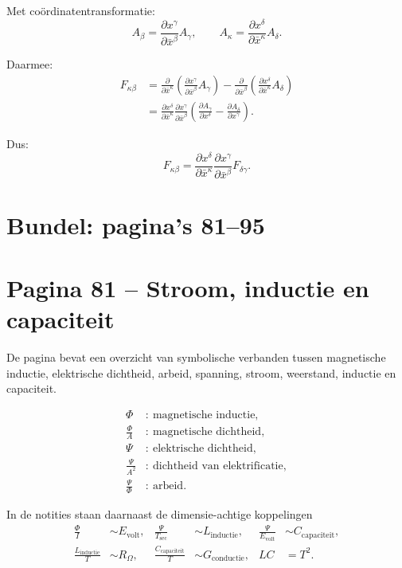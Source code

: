 \documentclass[11pt,a4paper]{article}
\begin{document}
Met coördinatentransformatie:
$$
A_{\beta}
=
\frac{\partial x^{\gamma}}{\partial \bar{x}^{\beta}}
A_{\gamma},
\qquad
A_{\kappa}
=
\frac{\partial x^{\delta}}{\partial \bar{x}^{\kappa}}
A_{\delta}.
$$

Daarmee:
\begin{align*}
F_{\kappa\beta}
&=
\frac{\partial}{\partial\bar{x}^{\kappa}}
\left(
\frac{\partial x^{\gamma}}{\partial\bar{x}^{\beta}}A_{\gamma}
\right)
-
\frac{\partial}{\partial\bar{x}^{\beta}}
\left(
\frac{\partial x^{\delta}}{\partial\bar{x}^{\kappa}}A_{\delta}
\right)\\
&=
\frac{\partial x^{\delta}}{\partial\bar{x}^{\kappa}}
\frac{\partial x^{\gamma}}{\partial\bar{x}^{\beta}}
\left(
\frac{\partial A_{\gamma}}{\partial x^{\delta}}
-
\frac{\partial A_{\delta}}{\partial x^{\gamma}}
\right).
\end{align*}

Dus:
$$
F_{\kappa\beta}
=
\frac{\partial x^{\delta}}{\partial\bar{x}^{\kappa}}
\frac{\partial x^{\gamma}}{\partial\bar{x}^{\beta}}
F_{\delta\gamma}.
$$

\clearpage
\section*{Bundel: pagina's 81--95}
\section*{Pagina 81 -- Stroom, inductie en capaciteit}

De pagina bevat een overzicht van symbolische verbanden tussen magnetische inductie, elektrische dichtheid, arbeid, spanning, stroom, weerstand, inductie en capaciteit.

\begin{align*}
\Phi &:\ \text{magnetische inductie},\\
\frac{\Phi}{A} &:\ \text{magnetische dichtheid},\\
\Psi &:\ \text{elektrische dichtheid},\\
\frac{\Psi}{A^{2}} &:\ \text{dichtheid van elektrificatie},\\
\frac{\Psi}{\Phi} &:\ \text{arbeid}.
\end{align*}

In de notities staan daarnaast de dimensie-achtige koppelingen
\begin{align*}
\frac{\Phi}{I} &\sim E_{\mathrm{volt}},&
\frac{\Psi}{T_{\mathrm{sec}}} &\sim L_{\mathrm{inductie}},&
\frac{\Psi}{E_{\mathrm{volt}}} &\sim C_{\mathrm{capaciteit}},\\
\frac{L_{\mathrm{inductie}}}{T} &\sim R_{\Omega},&
\frac{C_{\mathrm{capaciteit}}}{T} &\sim G_{\mathrm{conductie}},&
LC &= T^{2}.
\end{align*}
\end{document}
